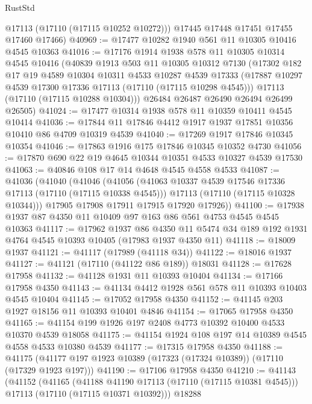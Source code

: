 \begin{lexlean}{RustStd}
\begin{coremodule}
        @17113
        (@17110 (@17115 @10252 @10272)))
      @17445
      @17448
      @17451
      @17455
      @17460
      @17466)
@40969 := @17477 @10282 @1940 @561 @11 @10305 @10416 @4545 @10363
@41016 := @17176
    @1914
    @1938
    @578
    @11
    @10305
    @10314
    @4545
    @10416
    (@40839
      @1913
      @503
      @11
      @10305
      @10312
      @7130
      (@17302
        @182
        @17
        @19
        @4589
        @10304
        @10311
        @4533
        @10287
        @4539
        @17333
        (@17887 @10297 @4539 @17300 @17336 @17113 (@17110 (@17115 @10298 @4545)))
        @17113
        (@17110 (@17115 @10288 @10304)))
      @26484
      @26487
      @26490
      @26494
      @26499
      @26505)
@41024 := @17477 @10314 @1938 @578 @11 @10359 @10411 @4545 @10414
@41036 := @17844 @11 @17846 @4412 @1917 @1937 @17851 @10356 @10410 @86 @4709 @10319 @4539
@41040 := @17269 @1917 @17846 @10345 @10354
@41046 := @17863 @1916 @175 @17846 @10345 @10352 @4730
@41056 := @17870 @690 @22 @19 @4645 @10344 @10351 @4533 @10327 @4539 @17530
@41063 := @40846 @108 @17 @14 @4648 @4545 @4558 @4533
@41087 := @41036
    (@41040
      (@41046
        (@41056
          (@41063 @10337 @4539 @17546 @17336 @17113 (@17110 (@17115 @10338 @4545)))
          @17113
          (@17110 (@17115 @10328 @10344)))
        @17905
        @17908
        @17911
        @17915
        @17920
        @17926))
@41100 := @17938 @1937 @87 @4350 @11 @10409 @97 @163 @86 @561 @4753 @4545 @4545 @10363
@41117 := @17962
    @1937
    @86
    @4350
    @11
    @5474
    @34
    @189
    @192
    @1931
    @4764
    @4545
    @10393
    @10405
    (@17983 @1937 @4350 @11)
@41118 := @18009 @1937
@41121 := @41117 (@17989 (@41118 @34))
@41122 := @18016 @1937
@41127 := @41121 (@17110 (@41122 @86 @189)) @18031
@41128 := @17628 @17958
@41132 := @41128 @1931 @11 @10393 @10404
@41134 := @17166 @17958 @4350
@41143 := @41134 @4412 @1928 @561 @578 @11 @10393 @10403 @4545 @10404
@41145 := @17052 @17958 @4350
@41152 := @41145 @203 @1927 @18156 @11 @10393 @10401 @4846
@41154 := @17065 @17958 @4350
@41165 := @41154 @199 @1926 @197 @2408 @4773 @10392 @10400 @4533 @10370 @4539 @18058
@41175 := @41154 @1924 @108 @197 @14 @10389 @4545 @4558 @4533 @10380 @4539
@41177 := @17315 @17958 @4350
@41188 := @41175 (@41177 @197 @1923 @10389 (@17323 (@17324 @10389)) (@17110 (@17329 @1923 @197)))
@41190 := @17106 @17958 @4350
@41210 := @41143
    (@41152
      (@41165
        (@41188 @41190 @17113 (@17110 (@17115 @10381 @4545)))
        @17113
        (@17110 (@17115 @10371 @10392)))
      @18288

\end{coremodule}
\end{lexlean}
